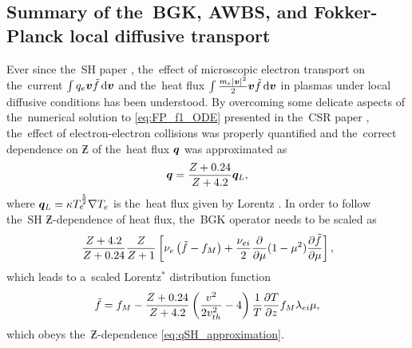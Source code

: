 
\subsection{Summary of the~BGK, AWBS, and Fokker-Planck local diffusive 
transport}
\label{sec:SummaryDiffusiveKinetics}

Ever since the~SH paper \cite{SpitzerHarm_PR1953}, the~effect of microscopic
electron transport on the~current $\int q_e \boldsymbol{v} \tilde{f} \, \text{d}\boldsymbol{v}$ 
and the~heat flux $\int \frac{m_e |\boldsymbol{v}|^2}{2} \boldsymbol{v} \tilde{f} \, \text{d}\boldsymbol{v}$ 
in plasmas
under local diffusive conditions has been understood. By overcoming some 
delicate aspects of the~numerical solution to \eqref{eq:FP_f1_ODE} presented 
in the~CSR paper \cite{CSR_1950}, the~effect of electron-electron collisions
was properly quantified and the~correct dependence on $\Zbar$ of the~heat flux
$\boldsymbol{q}$ was approximated as \cite{Epperlein_PoFB1991} 
\begin{equation}
  \boldsymbol{q} = \frac{Z + 0.24}{Z + 4.2} \boldsymbol{q}_L ,
  \label{eq:qSH_approximation}
\end{equation}
where $\boldsymbol{q}_L = \kappa T_e^{\frac{5}{2}}\nabla T_e$ is the~heat flux given 
by Lorentz \cite{Lorentz_1905}.
In order to follow the~SH $\Zbar$-dependence of heat flux, the~BGK operator 
needs to be scaled as
\begin{equation}
  \frac{Z + 4.2}{Z + 0.24}
  \frac{Z}{Z+1}\left[\nu_{e}\left(\tilde{f} - f_M\right)
  + \frac{\nu_{ei}}{2}
  \frac{\partial{}}{\partial{\mu}}(1 - \mu^2)\frac{\partial{\tilde{f}}}{\partial{\mu}}\right] ,
  \nonumber
\end{equation}
which leads to a~scaled Lorentz$^*$ distribution function
\begin{equation}
  \tilde{f} = f_M - \frac{Z+0.24}{Z+4.2}
  \left( \frac{v^2}{2 v_{th}^2} - 4\right)
  \frac{1}{T}\frac{\partial{T}}{\partial{z}}f_M \lambda_{ei} \mu ,
  \label{eq:Scaled_Lorentz}
\end{equation}
which obeys the~$\Zbar$-dependence \eqref{eq:qSH_approximation}.

